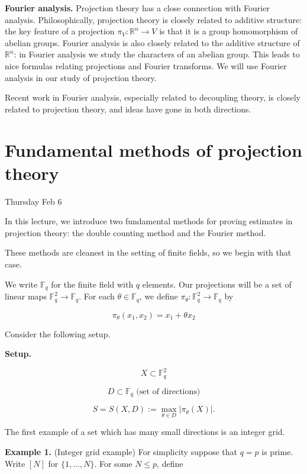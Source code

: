 \documentclass[12pt]{amsart}
\newcommand{\FF}{\mathbb{F}}
\newcommand{\RR}{\mathbb{R}}
\begin{document}
\vskip10pt

{\bf Fourier analysis.}  Projection theory has a close connection with Fourier analysis.  Philosophically, projection theory is closely related to additive structure: the key feature of a projection $\pi_V: \RR^n \rightarrow V$ is that it is a group homomorphism of abelian groups.  Fourier analysis is also closely related to the additive structure of $\RR^n$: in Fourier analysis we study the characters of an abelian group.  This leads to nice formulas relating projections and Fourier transforms.  We will use Fourier analysis in our study of projection theory.

Recent work in Fourier analysis, especially related to decoupling theory, is closely related to projection theory, and ideas have gone in both directions.  

\newpage

\section{Fundamental methods of projection theory}

Thursday Feb 6

In this lecture, we introduce two fundamental methods for proving estimates in projection theory: the double counting method and the Fourier method.

These methods are cleanest in the setting of finite fields, so we begin with that case.  

We write $\FF_q$ for the finite field with $q$ elements.  Our projections will be a set of linear maps $\FF_q^2 \rightarrow \FF_q$.  For each $\theta \in \FF_q$, we define $\pi_\theta: \FF_q^2 \rightarrow \FF_q$ by

\begin{equation}
\pi_\theta(x_1, x_2) = x_1 + \theta x_2    
\end{equation}

Consider the following setup.

{\bf Setup.}

$$ X \subset \FF_q^2$$

$$ D \subset \FF_q \textrm{ (set of directions)}$$

$$ S = S(X,D) := \max_{\theta \in D} | \pi_\theta(X) |. $$

\vskip10pt

The first example of a set which has many small directions is an integer grid.

\vskip10pt

{\bf Example 1.} (Integer grid example) For simplicity suppose that $q=p$ is prime.  Write $[N]$ for $\{1, ..., N\}$.  For some $N \le p$, define
\end{document}
